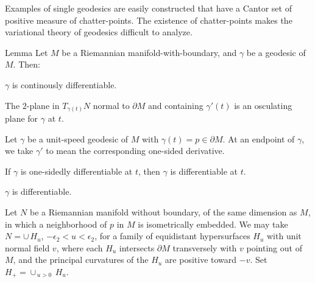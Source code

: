 Examples of single geodesics are easily constructed that have a Cantor set of positive measure of chatter-points.
The existence of chatter-points makes the variational theory of geodesics
difficult to analyze.


\begin{thm}{Lemma}\label{lem:m-w-b-geodesic-'}
Let $M$ be a Riemannian manifold-with-boundary, and $\gamma$ be a geodesic of $M$. Then:
\begin{subthm}{}
$\gamma$ is continously differentiable.
\end{subthm}
\begin{subthm}{}
The $2$-plane in $T_{\gamma(t)}N$  normal to $\partial M$ and containing $\gamma'(t)$ is an osculating plane for $\gamma$ at $t$.
\end{subthm}
\end{thm}


Let  $\gamma$ be a unit-speed geodesic of $M$ with $\gamma(t)=p\in\partial M$.  
At an endpoint of $\gamma$, we take $\gamma'$ to mean the corresponding one-sided derivative.

\begin{clm}{}\label{clm:1-sided-geo-mwb}
If $\gamma$ is one-sidedly differentiable at $t$, then $\gamma$ is differentiable at $t$.
\end{clm}

\begin{clm}{}\label{clm:diff-geo-mwb}
$\gamma$ is differentiable.
\end{clm}
Let $N$ be a Riemannian manifold without boundary, of the same dimension as $M$, in which  a neighborhood of $p$ in $M$ is isometrically embedded. We may take  $N=\cup \,H_u$, $-\epsilon_2<u<\epsilon_2$, for a family of equidistant hypersurfaces $H_u$ with unit normal field $v$,  where each $H_u$ intersects $\partial M$ transversely with $v$ pointing out of $M$, and the 
principal curvatures of the $H_u$ are positive toward $-v$. 
Set $H_+=\cup_{\,u>0} \,H_u$.

